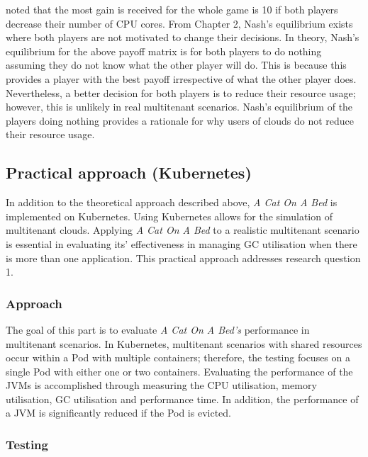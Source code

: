 noted that the most gain is received for the whole game is 10 if both
players decrease their number of CPU cores.
\newline\newline
From Chapter 2, Nash's equilibrium exists where both players are not
motivated to change their decisions. In theory, Nash's equilibrium for
the above payoff matrix is for both players to do nothing assuming they
do not know what the other player will do. This is because this provides
a player with the best payoff irrespective of what the other player
does. Nevertheless, a better decision for both players is to reduce
their resource usage; however, this is unlikely in real multitenant
scenarios. Nash's equilibrium of the players doing nothing provides a
rationale for why users of clouds do not reduce their resource usage.

\subsection{Practical approach (Kubernetes)}
In addition to the theoretical approach described above, \emph{A Cat On A
Bed} is implemented on Kubernetes. Using Kubernetes allows for the
simulation of multitenant clouds. Applying \emph{A Cat On A Bed} to a realistic
multitenant scenario is essential in evaluating its' effectiveness in
managing GC utilisation when there is more than one application. This practical approach
addresses research question 1.

\subsubsection{Approach}

The goal of this part is to evaluate \emph{A Cat On A Bed's} performance
in multitenant scenarios. In Kubernetes, multitenant scenarios with shared resources occur
within a Pod with multiple containers; therefore, the testing focuses on a single Pod with either
one or two containers. Evaluating the performance of the JVMs is
accomplished through measuring the CPU utilisation, memory utilisation,
GC utilisation and performance time. In addition, the performance of a
JVM is significantly reduced if the Pod is evicted.
\subsubsection{Testing}

